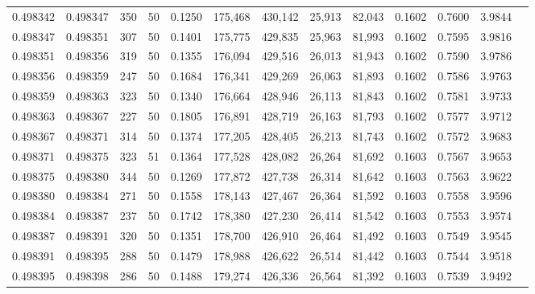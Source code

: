 \begin{tabular}{rrrrrrrrrrrrr}
0.498342 & 0.498347 & 350 &  50 &                                     0.1250 & 175,468 & 430,142 &  25,913 &  82,043 & 0.1602 & 0.7600 & 3.9844 \\
0.498347 & 0.498351 & 307 &  50 &                                     0.1401 & 175,775 & 429,835 &  25,963 &  81,993 & 0.1602 & 0.7595 & 3.9816 \\
0.498351 & 0.498356 & 319 &  50 &                                     0.1355 & 176,094 & 429,516 &  26,013 &  81,943 & 0.1602 & 0.7590 & 3.9786 \\
0.498356 & 0.498359 & 247 &  50 &                                     0.1684 & 176,341 & 429,269 &  26,063 &  81,893 & 0.1602 & 0.7586 & 3.9763 \\
0.498359 & 0.498363 & 323 &  50 &                                     0.1340 & 176,664 & 428,946 &  26,113 &  81,843 & 0.1602 & 0.7581 & 3.9733 \\
0.498363 & 0.498367 & 227 &  50 &                                     0.1805 & 176,891 & 428,719 &  26,163 &  81,793 & 0.1602 & 0.7577 & 3.9712 \\
0.498367 & 0.498371 & 314 &  50 &                                     0.1374 & 177,205 & 428,405 &  26,213 &  81,743 & 0.1602 & 0.7572 & 3.9683 \\
0.498371 & 0.498375 & 323 &  51 &                                     0.1364 & 177,528 & 428,082 &  26,264 &  81,692 & 0.1603 & 0.7567 & 3.9653 \\
0.498375 & 0.498380 & 344 &  50 &                                     0.1269 & 177,872 & 427,738 &  26,314 &  81,642 & 0.1603 & 0.7563 & 3.9622 \\
0.498380 & 0.498384 & 271 &  50 &                                     0.1558 & 178,143 & 427,467 &  26,364 &  81,592 & 0.1603 & 0.7558 & 3.9596 \\
0.498384 & 0.498387 & 237 &  50 &                                     0.1742 & 178,380 & 427,230 &  26,414 &  81,542 & 0.1603 & 0.7553 & 3.9574 \\
0.498387 & 0.498391 & 320 &  50 &                                     0.1351 & 178,700 & 426,910 &  26,464 &  81,492 & 0.1603 & 0.7549 & 3.9545 \\
0.498391 & 0.498395 & 288 &  50 &                                     0.1479 & 178,988 & 426,622 &  26,514 &  81,442 & 0.1603 & 0.7544 & 3.9518 \\
0.498395 & 0.498398 & 286 &  50 &                                     0.1488 & 179,274 & 426,336 &  26,564 &  81,392 & 0.1603 & 0.7539 & 3.9492 \\

\end{tabular}
